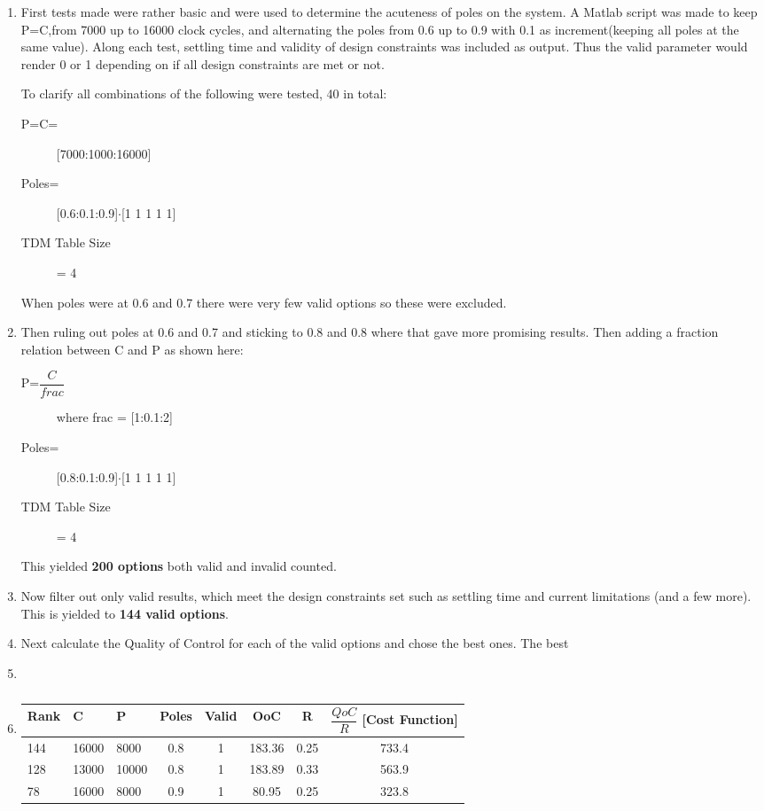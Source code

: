 \begin{enumerate}
	\item First tests made were rather basic and were used to determine the acuteness of poles on the system. A Matlab script was made to keep P=C,from 7000 up to 16000 clock cycles, and alternating the poles from 0.6 up to 0.9 with 0.1 as increment(keeping all poles at the same value). Along each test, settling time and validity of design constraints was included as output. Thus the valid parameter would render 0 or 1 depending on if all design constraints are met or not.
	
	To clarify all combinations of the following were tested, 40 in total:
	\begin{description}
		\item[P=C=] [7000:1000:16000]
		\item[Poles=] [0.6:0.1:0.9]$\cdot$[1 1 1 1 1]
		\item[TDM Table Size] = 4
	\end{description}
	When poles were at 0.6 and 0.7 there were very few valid options so these were excluded.
	
	\item Then ruling out poles at 0.6 and 0.7 and sticking to 0.8 and 0.8 where that gave more promising results. Then adding a fraction relation between C and P as shown here:
		\begin{description}
			\item[P=$\dfrac{C}{frac}$] where frac = [1:0.1:2]
			\item[Poles=] [0.8:0.1:0.9]$\cdot$[1 1 1 1 1]
			\item[TDM Table Size] = 4
		\end{description}
	This yielded \textbf{200 options} both valid and invalid counted.
	\item Now filter out only valid results, which meet the design constraints set such as settling time and current limitations (and a few more). This is yielded to \textbf{144 valid options}.
	\item Next calculate the Quality of Control for each of the valid options and chose the best ones. The best 
	\item
	\item
	\begin{table}[htbp]
		\centering
		\caption{}
		\begin{tabular}{lllccccc}
			\toprule
			Rank & C& P & Poles &Valid &OoC & R & $\dfrac{QoC}{R}$ [Cost Function] \\ 
		\midrule
		144 & 16000 & 8000 & 0.8 & 1 & 183.36 & 0.25 & 733.4 \\ 
		128 & 13000 & 10000 & 0.8 & 1 & 183.89 & 0.33 & 563.9 \\ 
		78 & 16000 & 8000 & 0.9 & 1 & 80.95 & 0.25 & 323.8 \\ 
	\midrule
	\end{tabular}
	\label{}
\end{table}

\end{enumerate}

